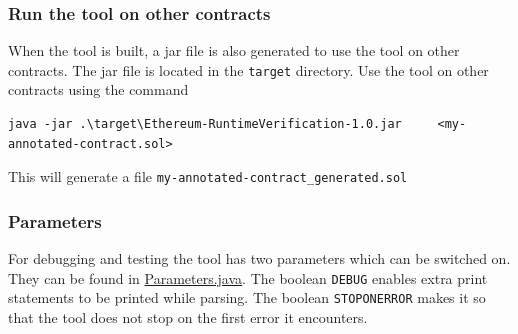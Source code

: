 \documentclass[a4paper]{article}
\begin{document}
\hypertarget{run-the-tool-on-other-contracts}{%
\subsubsection{Run the tool on other
contracts}\label{run-the-tool-on-other-contracts}}

When the tool is built, a jar file is also generated to use the tool on
other contracts. The jar file is located in the \texttt{target}
directory. Use the tool on other contracts using the command

\begin{verbatim}
java -jar .\target\Ethereum-RuntimeVerification-1.0.jar     <my-annotated-contract.sol>
\end{verbatim}

This will generate a file \texttt{my-annotated-contract\_generated.sol}

\hypertarget{parameters}{%
\subsubsection{Parameters}\label{parameters}}

For debugging and testing the tool has two parameters which can be
switched on. They can be found in
\href{https://github.com/LarsStegeman/EthereumRuntimeMonitoring/blob/master/src/main/java/utils/Parameters.java}{Parameters.java}. The boolean
\texttt{DEBUG} enables extra print statements to be printed while
parsing. The boolean \texttt{STOPONERROR} makes it so that the tool does
not stop on the first error it encounters.

\newpage


\end{document}
